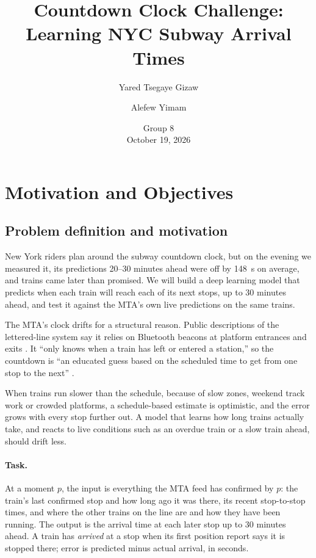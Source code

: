 \documentclass[10pt,letterpaper,twocolumn]{article}
\title{Countdown Clock Challenge: Learning NYC Subway Arrival Times}
\author{Yared Tsegaye Gizaw \and Alefew Yimam}
\date{Group 8\\[4pt]October 19, 2026}
\begin{document}
\maketitle

\section{Motivation and Objectives}

\subsection{Problem definition and motivation}

New York riders plan around the subway countdown clock, but on the evening we measured it, its predictions 20--30 minutes ahead were off by 148~s on average, and trains came later than promised. We will build a deep learning model that predicts when each train will reach each of its next stops, up to 30 minutes ahead, and test it against the MTA's own live predictions on the same trains.

The MTA's clock drifts for a structural reason. Public descriptions of the lettered-line system say it relies on Bluetooth beacons at platform entrances and exits \citep{sas2016}. It ``only knows when a train has left or entered a station,'' so the countdown is ``an educated guess based on the scheduled time to get from one stop to the next'' \citep{gordon2018}.

When trains run slower than the schedule, because of slow zones, weekend track work or crowded platforms, a schedule-based estimate is optimistic, and the error grows with every stop further out. A model that learns how long trains actually take, and reacts to live conditions such as an overdue train or a slow train ahead, should drift less.

\paragraph{Task.} At a moment $p$, the input is everything the MTA feed has confirmed by $p$: the train's last confirmed stop and how long ago it was there, its recent stop-to-stop times, and where the other trains on the line are and how they have been running. The output is the arrival time at each later stop up to 30 minutes ahead. A train has \emph{arrived} at a stop when its first position report says it is stopped there; error is predicted minus actual arrival, in seconds.
\end{document}
